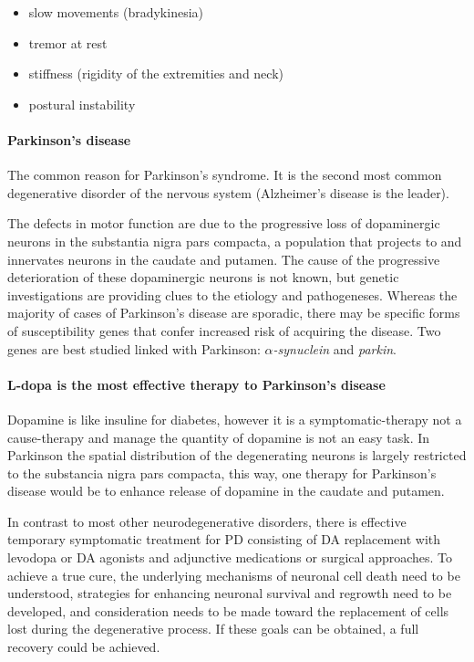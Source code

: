 \documentclass[12pt,article,oneside,a4paper]{memoir}
\begin{document}
\begin{itemize}
\item slow movements (bradykinesia)
\item tremor at rest
\item stiffness (rigidity of the extremities and neck)
\item postural instability
\end{itemize}

\paragraph{Parkinson's disease}
The common reason for Parkinson's syndrome. It is the second most common
degenerative disorder of the nervous system (Alzheimer's disease is the leader).

The defects in motor function are due to the progressive loss of dopaminergic
neurons in the substantia nigra pars compacta, a population that projects to
and innervates neurons in the caudate and putamen.
The cause of the progressive deterioration of these dopaminergic neurons is not
known, but genetic investigations are providing clues to the etiology and
pathogeneses. Whereas the majority of cases of Parkinson’s disease are
sporadic, there may be specific forms of susceptibility genes that confer
increased risk of acquiring the disease. Two genes are best studied linked with
Parkinson: \textit{$\alpha$-synuclein} and \textit{parkin}.

\paragraph{L-dopa is the most effective therapy to Parkinson's disease}
Dopamine is like insuline for diabetes, however it is a symptomatic-therapy not
a cause-therapy and manage the quantity of dopamine is not an easy task.
In Parkinson the spatial distribution of the degenerating neurons is largely
restricted to the substancia nigra pars compacta, this way, one therapy for
Parkinson’s disease would be to enhance release of dopamine in the caudate and
putamen.

In contrast to most other neurodegenerative disorders, there is effective
temporary symptomatic treatment for PD consisting of DA replacement with
levodopa or DA agonists and adjunctive medications or surgical approaches. To
achieve a true cure, the underlying mechanisms of neuronal cell death need to
be understood, strategies for enhancing neuronal survival and regrowth need to
be developed, and consideration needs to be made toward the replacement of
cells lost during the degenerative process. If these goals can be obtained, a
full recovery could be achieved.
\end{document}
